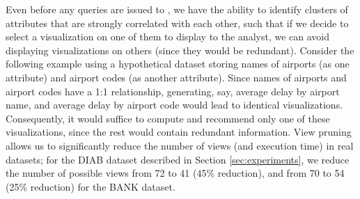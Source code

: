 

Even before any queries are issued to \SeeDB, we
have the ability to identify clusters of attributes
that are strongly correlated with each other, 
such that if we decide to select a visualization 
on one of them to display to the analyst, we can avoid 
displaying visualizations on others
(since they would be redundant).
Consider the following example using a hypothetical
dataset storing 
names of airports (as one attribute)
and airport codes (as another attribute).
Since names of airports and airport codes have
a 1:1 relationship, generating, say, 
average delay by airport name, and
average delay by airport code would lead
to identical visualizations. 
Consequently, it would suffice to compute and recommend
only one of these visualizations,
since the rest would contain redundant information.
View pruning allows us to significantly 
reduce the number of views (and execution time) in real
datasets; for the DIAB dataset described in Section \ref{sec:experiments},
we reduce the number of possible views from 72 to 41 (45\% reduction), and from
70 to 54 (25\% reduction) for the BANK dataset. 




